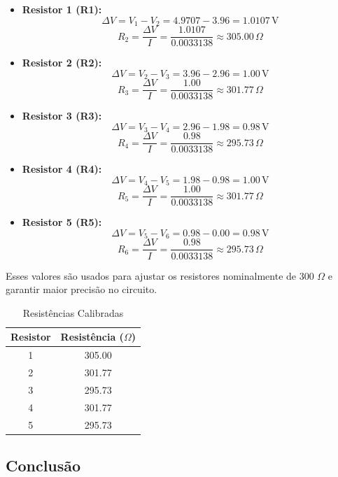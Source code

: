 \documentclass[a4paper,12pt]{article}
\begin{document}
\begin{itemize}

    \item \textbf{Resistor 1 (R1):}
    \[
    \Delta V = V_1 - V_2 = 4.9707 - 3.96 = 1.0107 \, \text{V}
    \]
    \[
    R_2 = \frac{\Delta V}{I} = \frac{1.0107}{0.0033138} \approx 305.00 \, \Omega
    \]

    \item \textbf{Resistor 2 (R2):}
    \[
    \Delta V = V_2 - V_3 = 3.96 - 2.96 = 1.00 \, \text{V}
    \]
    \[
    R_3 = \frac{\Delta V}{I} = \frac{1.00}{0.0033138} \approx 301.77 \, \Omega
    \]

    \item \textbf{Resistor 3 (R3):}
    \[
    \Delta V = V_3 - V_4 = 2.96 - 1.98 = 0.98 \, \text{V}
    \]
    \[
    R_4 = \frac{\Delta V}{I} = \frac{0.98}{0.0033138} \approx 295.73 \, \Omega
    \]

    \item \textbf{Resistor 4 (R4):}
    \[
    \Delta V = V_4 - V_5 = 1.98 - 0.98 = 1.00 \, \text{V}
    \]
    \[
    R_5 = \frac{\Delta V}{I} = \frac{1.00}{0.0033138} \approx 301.77 \, \Omega
    \]

    \item \textbf{Resistor 5 (R5):}
    \[
    \Delta V = V_5 - V_6 = 0.98 - 0.00 = 0.98 \, \text{V}
    \]
    \[
    R_6 = \frac{\Delta V}{I} = \frac{0.98}{0.0033138} \approx 295.73 \, \Omega
    \]
\end{itemize}

Esses valores são usados para ajustar os resistores nominalmente de 300 $\Omega$ e garantir maior precisão no circuito.


\vspace{1em}
\begin{table}[ht]
    \centering
    \begin{tabular}{|c|c|}
        \hline
        Resistor & Resistência ($\Omega$) \\
        \hline
        1 & 305.00 \\
        2 & 301.77 \\
        3 & 295.73 \\
        4 & 301.77 \\
        5 & 295.73 \\
        \hline
    \end{tabular}
    \caption{Resistências Calibradas}
    \label{tab:tensoes}
\end{table}


\subsection{Conclusão}
\leavevmode
\end{document}
